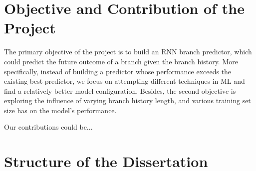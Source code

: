 \section{Objective and Contribution of the Project}
\label{sec:objective}

The primary objective of the project is to build an RNN branch predictor, which could predict the future outcome of a branch given the branch history. More specifically, instead of building a predictor whose performance exceeds the existing best predictor, we focus on attempting different techniques in ML and find a relatively better model configuration. Besides, the second objective is exploring the influence of varying branch history length, and various training set size has on the model's performance.

Our contributions could be...

\section{Structure of the Dissertation}
\label{sec:structure}
